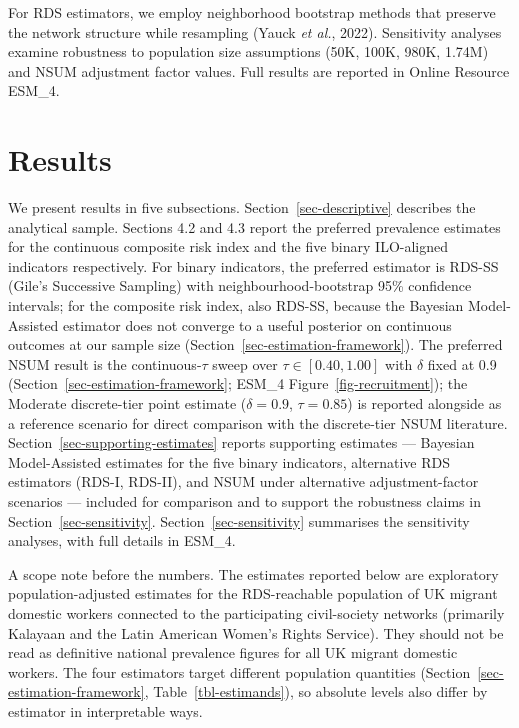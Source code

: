\documentclass[
  12pt,
  letterpaper,
  DIV=11,
  numbers=noendperiod]{scrartcl}
\begin{document}
For RDS estimators, we employ neighborhood bootstrap methods that
preserve the network structure while resampling (Yauck \emph{et al.},
2022). Sensitivity analyses examine robustness to population size
assumptions (50K, 100K, 980K, 1.74M) and NSUM adjustment factor values.
Full results are reported in Online Resource ESM\_4.

\section{Results}\label{sec-results}

We present results in five subsections. Section~\ref{sec-descriptive}
describes the analytical sample. Sections 4.2 and 4.3 report the
preferred prevalence estimates for the continuous composite risk index
and the five binary ILO-aligned indicators respectively. For binary
indicators, the preferred estimator is RDS-SS (Gile's Successive
Sampling) with neighbourhood-bootstrap 95\% confidence intervals; for
the composite risk index, also RDS-SS, because the Bayesian
Model-Assisted estimator does not converge to a useful posterior on
continuous outcomes at our sample size
(Section~\ref{sec-estimation-framework}). The preferred NSUM result is
the continuous-\(\tau\) sweep over \(\tau \in [0.40, 1.00]\) with
\(\delta\) fixed at 0.9 (Section~\ref{sec-estimation-framework}; ESM\_4
Figure~\ref{fig-recruitment}); the Moderate discrete-tier point estimate
(\(\delta = 0.9\), \(\tau = 0.85\)) is reported alongside as a reference
scenario for direct comparison with the discrete-tier NSUM literature.
Section~\ref{sec-supporting-estimates} reports supporting estimates ---
Bayesian Model-Assisted estimates for the five binary indicators,
alternative RDS estimators (RDS-I, RDS-II), and NSUM under alternative
adjustment-factor scenarios --- included for comparison and to support
the robustness claims in Section~\ref{sec-sensitivity}.
Section~\ref{sec-sensitivity} summarises the sensitivity analyses, with
full details in ESM\_4.

A scope note before the numbers. The estimates reported below are
exploratory population-adjusted estimates for the RDS-reachable
population of UK migrant domestic workers connected to the participating
civil-society networks (primarily Kalayaan and the Latin American
Women's Rights Service). They should not be read as definitive national
prevalence figures for all UK migrant domestic workers. The four
estimators target different population quantities
(Section~\ref{sec-estimation-framework}, Table~\ref{tbl-estimands}), so
absolute levels also differ by estimator in interpretable ways.
\end{document}
